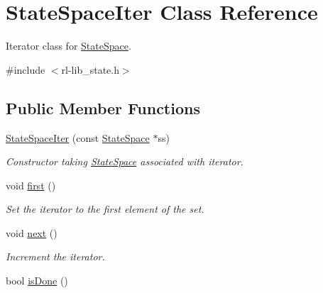 \hypertarget{classStateSpaceIter}{\section{State\-Space\-Iter Class Reference}
\label{classStateSpaceIter}
}


Iterator class for \hyperlink{classStateSpace}{State\-Space}.  




{\ttfamily \#include $<$rl-\/lib\-\_\-state.\-h$>$}

\subsection*{Public Member Functions}
\begin{DoxyCompactItemize}
\item 
\hyperlink{classStateSpaceIter_a89178bf983f058a0ca4f4eb85e3e36bc}{State\-Space\-Iter} (const \hyperlink{classStateSpace}{State\-Space} $\ast$ss)
\begin{DoxyCompactList}\small\item\em Constructor taking \hyperlink{classStateSpace}{State\-Space} associated with iterator. \end{DoxyCompactList}\item 
\hypertarget{classStateSpaceIter_a7a4fd2989777c4c9af8ca0a2c6dae4bf}{void \hyperlink{classStateSpaceIter_a7a4fd2989777c4c9af8ca0a2c6dae4bf}{first} ()}\label{classStateSpaceIter_a7a4fd2989777c4c9af8ca0a2c6dae4bf}

\begin{DoxyCompactList}\small\item\em Set the iterator to the first element of the set. \end{DoxyCompactList}\item 
\hypertarget{classStateSpaceIter_a76f8c81ce415f9d504f334f9ae764e78}{void \hyperlink{classStateSpaceIter_a76f8c81ce415f9d504f334f9ae764e78}{next} ()}\label{classStateSpaceIter_a76f8c81ce415f9d504f334f9ae764e78}

\begin{DoxyCompactList}\small\item\em Increment the iterator. \end{DoxyCompactList}\item 
\hypertarget{classStateSpaceIter_a35788e48888ea301fd5cdc6ad38b444c}{bool \hyperlink{classStateSpaceIter_a35788e48888ea301fd5cdc6ad38b444c}{is\-Done} ()}\label{classStateSpaceIter_a35788e48888ea301fd5cdc6ad38b444c}


\end{DoxyCompactItemize}
